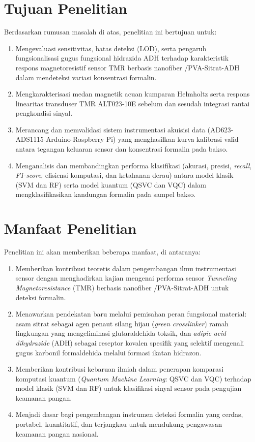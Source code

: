 \section{Tujuan Penelitian}
Berdasarkan rumusan masalah di atas, penelitian ini bertujuan untuk:
\begin{enumerate}
    \item Mengevaluasi sensitivitas, batas deteksi (LOD), serta pengaruh fungsionalisasi gugus fungsional hidrazida ADH terhadap karakteristik respons magnetoresistif sensor TMR berbasis nanofiber /PVA-Sitrat-ADH dalam mendeteksi variasi konsentrasi formalin.
    \item Mengkarakterisasi medan magnetik acuan kumparan Helmholtz serta respons linearitas transduser TMR ALT023-10E sebelum dan sesudah integrasi rantai pengkondisi sinyal.
    \item Merancang dan memvalidasi sistem instrumentasi akuisisi data (AD623-ADS1115-Arduino-Raspberry Pi) yang menghasilkan kurva kalibrasi valid antara tegangan keluaran sensor dan konsentrasi formalin pada bakso.
    \item Menganalisis dan membandingkan performa klasifikasi (akurasi, presisi, \textit{recall}, \textit{F1-score}, efisiensi komputasi, dan ketahanan derau) antara model klasik (SVM dan RF) serta model kuantum (QSVC dan VQC) dalam mengklasifikasikan kandungan formalin pada sampel bakso.
\end{enumerate}

\section{Manfaat Penelitian}
Penelitian ini akan memberikan beberapa manfaat, di antaranya:
\begin{enumerate}
    \item Memberikan kontribusi teoretis dalam pengembangan ilmu instrumentasi sensor dengan menghadirkan kajian mengenai performa sensor \textit{Tunneling Magnetoresistance} (TMR) berbasis nanofiber /PVA-Sitrat-ADH untuk deteksi formalin.
    \item Menawarkan pendekatan baru melalui pemisahan peran fungsional material: asam sitrat sebagai agen penaut silang hijau (\textit{green crosslinker}) ramah lingkungan yang mengeliminasi glutaraldehida toksik, dan \textit{adipic acid dihydrazide} (ADH) sebagai reseptor kovalen spesifik yang selektif mengenali gugus karbonil formaldehida melalui formasi ikatan hidrazon.
    \item Memberikan kontribusi kebaruan ilmiah dalam penerapan komparasi komputasi kuantum (\textit{Quantum Machine Learning}: QSVC dan VQC) terhadap model klasik (SVM dan RF) untuk klasifikasi sinyal sensor pada pengujian keamanan pangan.
    \item Menjadi dasar bagi pengembangan instrumen deteksi formalin yang cerdas, portabel, kuantitatif, dan terjangkau untuk mendukung pengawasan keamanan pangan nasional.
\end{enumerate}

